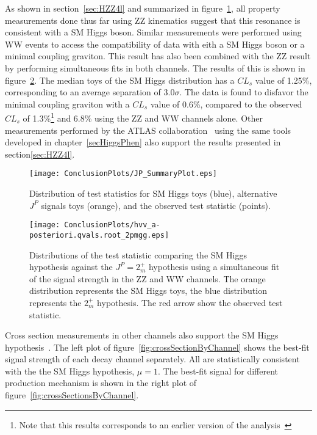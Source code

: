As shown in section~\ref{sec:HZZ4l} and summarized in
figure~\ref{fig:spinParitySummary}, all property measurements
done thus far using ZZ kinematics suggest that this resonance
is consistent with a SM Higgs boson.   Similar measurements
were performed using WW events to access the compatibility 
of data with eith a SM Higgs boson or a minimal coupling graviton.
This result has also been combined with the ZZ result by performing
simultaneous fits in both channels\cite{CMS:yva}.  The results of this is shown
in figure~\ref{fig:2mp_spinCombination}.  The median toys of
the SM Higgs distribution
has a $CL_s$ value of 1.25\%, corresponding to an average
separation of $3.0\sigma$.  The data is found to disfavor the
minimal coupling graviton with a $CL_s$ value of 0.6\%, compared
to the observed $CL_s$ of 1.3\%\footnote{Note that this results
corresponds to an earlier version of the analysis~\cite{CMS:xwa}}
and 6.8\% using the ZZ and WW channels alone.  Other measurements
performed by the ATLAS collaboration~\cite{ATLAS:2013mla,ATLAS:2013mla} using the same tools
developed in chapter~\ref{secHiggsPhen} also support the results
presented in section\ref{sec:HZZ4l}.



\begin{figure}
\begin{center}
\texttt{[image: ConclusionPlots/JP\_SummaryPlot.eps]}
\caption{Distribution of test statistics for SM Higgs toys (blue),
 alternative $J^P$ signals toys (orange), and the observed test
statistic (points).}
\label{fig:spinParitySummary}

\end{center}
\end{figure}
\begin{figure}
\begin{center}
\texttt{[image: ConclusionPlots/hvv\_a-posteriori.qvals.root\_2pmgg.eps]}
\caption{Distributions of the test statistic comparing the 
SM Higgs hypothesis against the $J^P=2_m^+$ hypothesis using a
simultaneous fit of the signal strength in the ZZ and WW channels.
The orange distribution represents the SM Higgs toys, the blue 
distribution represents the $2_m^+$ hypothesis.  The red arrow
show the observed test statistic. }
\label{fig:2mp_spinCombination}
\end{center}
\end{figure}

Cross section measurements in other channels also support the 
SM Higgs hypothesis~\cite{CMS:yva}.  The left plot of
figure~\ref{fig:crossSectionByChannel} shows the best-fit signal 
strength of each decay channel separately.  All are statistically
consistent with the the SM Higgs hypothesis, $\mu=1$.  
The best-fit signal for different production mechanism is shown
in the right plot of figure~\ref{fig:crossSectionsByChannel}.


